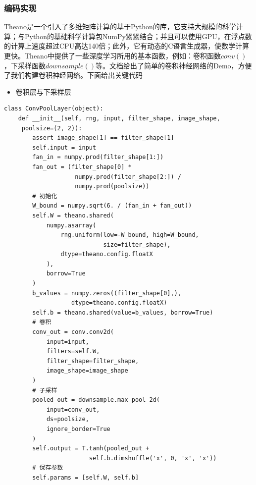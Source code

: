 \documentclass[bachelor,zhspacing]{cqu}  %
\def\tightlist{}
\begin{document}
\subsubsection{编码实现}\label{ux7f16ux7801ux5b9eux73b0}

Theano是一个引入了多维矩阵计算的基于Python的库，它支持大规模的科学计算；与Python的基础科学计算包NumPy紧紧结合；并且可以使用GPU，在浮点数的计算上速度超过CPU高达140倍；此外，它有动态的C语言生成器，使数学计算更快。Theano中提供了一些深度学习所用的基本函数，例如：卷积函数\(conv()\)，下采样函数\(downsample()\)等。文档给出了简单的卷积神经网络的Demo，方便了我们构建卷积神经网络。下面给出关键代码

\begin{itemize}
\tightlist
\item
  卷积层与下采样层
\end{itemize}

\begin{verbatim}
class ConvPoolLayer(object):
    def __init__(self, rng, input, filter_shape, image_shape,
     poolsize=(2, 2)):
        assert image_shape[1] == filter_shape[1]
        self.input = input
        fan_in = numpy.prod(filter_shape[1:])
        fan_out = (filter_shape[0] * 
                    numpy.prod(filter_shape[2:]) /
                    numpy.prod(poolsize))
        # 初始化
        W_bound = numpy.sqrt(6. / (fan_in + fan_out))
        self.W = theano.shared(
            numpy.asarray(
                rng.uniform(low=-W_bound, high=W_bound, 
                            size=filter_shape),
                dtype=theano.config.floatX
            ),
            borrow=True
        )
        b_values = numpy.zeros((filter_shape[0],), 
                   dtype=theano.config.floatX)
        self.b = theano.shared(value=b_values, borrow=True)
        # 卷积
        conv_out = conv.conv2d(
            input=input,
            filters=self.W,
            filter_shape=filter_shape,
            image_shape=image_shape
        )
        # 子采样
        pooled_out = downsample.max_pool_2d(
            input=conv_out,
            ds=poolsize,
            ignore_border=True
        )
        self.output = T.tanh(pooled_out + 
                        self.b.dimshuffle('x', 0, 'x', 'x'))
        # 保存参数
        self.params = [self.W, self.b]
\end{verbatim}
\end{document}
